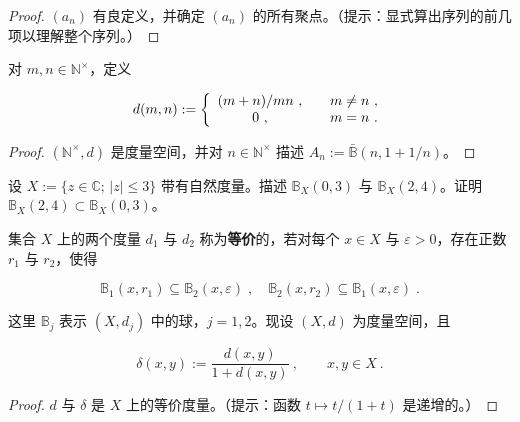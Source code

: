 \begin{proof}

$ (a_{n}) $ 有良定义，并确定  $ (a_{n}) $ 的所有聚点。（提示：显式算出序列的前几项以理解整个序列。）

\end{proof}

\begin{exercises}
\item[7.]

对  $ m, n \in \mathbb{N}^\times $，定义

\begin{equation*}
d(m,n):=\left\{\begin{array}{c l}{(m+n)/m n~,}&{\quad m\neq n~,}\\ {0~,}&{\quad m=n~.}\\ \end{array}\right.
\end{equation*}
\end{exercises}

\begin{proof}

$ (\mathbb{N}^\times, d) $ 是度量空间，并对  $ n \in \mathbb{N}^\times $ 描述  $ A_n := \bar{\mathbb{B}}(n, 1 + 1/n) $。

\end{proof}

\begin{exercises}
\item[8.]

设  $ X := \{ z \in \mathbb{C} ; \, |z| \leq 3 \} $ 带有自然度量。描述  $ \mathbb{B}_X(0,3) $ 与  $ \mathbb{B}_X(2,4) $。证明  $ \mathbb{B}_X(2,4) \subset \mathbb{B}_X(0,3) $。

\item[9.]

集合  $ X $ 上的两个度量  $ d_1 $ 与  $ d_2 $ 称为\textbf{等价}的，若对每个  $ x \in X $ 与  $ \varepsilon > 0 $，存在正数  $ r_1 $ 与  $ r_2 $，使得

\[
\mathbb{B}_{1}(x,r_{1})\subseteq\mathbb{B}_{2}(x,\varepsilon)\;,\quad\mathbb{B}_{2}(x,r_{2})\subseteq\mathbb{B}_{1}(x,\varepsilon)\;.
\]

这里 $\mathbb{B}_j$ 表示 $(X, d_j)$ 中的球，$j = 1, 2$。现设 $(X, d)$ 为度量空间，且

\[
\delta(x,y):=\frac{d(x,y)}{1+d(x,y)}~,\qquad x,y\in X~.
\]
\end{exercises}

\begin{proof}

$d$ 与 $\delta$ 是 $X$ 上的等价度量。（提示：函数 $t \mapsto t/(1 + t)$ 是递增的。）

\end{proof}

